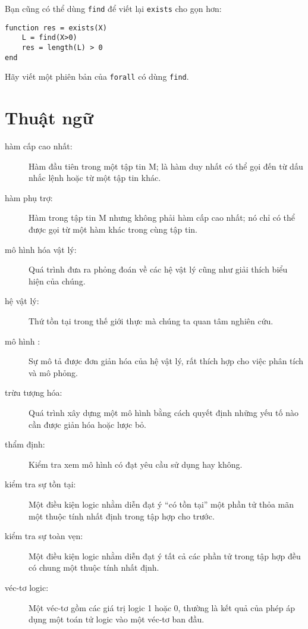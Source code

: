 \documentclass[12pt]{book}
\begin{document}
Bạn cũng có thể dùng {\tt find} để viết lại {\tt exists} cho gọn hơn:

\begin{verbatim}
function res = exists(X)
    L = find(X>0)
    res = length(L) > 0
end
\end{verbatim}
%
\begin{ex}
Hãy viết một phiên bản của {\tt forall} có dùng {\tt find}.
\end{ex}


\section{Thuật ngữ}

\begin{description}

\item[hàm cấp cao nhất:]  Hàm đầu tiên trong một tập tin M;
là hàm duy nhất có thể gọi đến từ dấu nhắc lệnh hoặc từ
một tập tin khác.

\item[hàm phụ trợ:] Hàm trong tập tin M nhưng không phải
hàm cấp cao nhất; nó chỉ có thể được gọi từ một hàm khác
trong cùng tập tin.

\item[mô hình hóa vật lý:] Quá trình đưa ra phỏng đoán về các
hệ vật lý cũng như giải thích biểu hiện của chúng.

\item[hệ vật lý:] Thứ tồn tại trong thế giới thực mà chúng ta
quan tâm nghiên cứu.

\item[mô hình :] Sự mô tả được đơn giản hóa của hệ vật lý,
rất thích hợp cho việc phân tích và mô phỏng.

\item[trừu tượng hóa:] Quá trình xây dựng một mô hình bằng cách
quyết định những yếu tố nào cần được giản hóa hoặc lược bỏ.

\item[thẩm định:] Kiểm tra xem mô hình có đạt yêu cầu sử dụng
hay không.

\item[kiểm tra sự tồn tại:] Một điều kiện logic nhằm diễn đạt ý
``có tồn tại'' một phần tử thỏa mãn một thuộc tính nhất định 
trong tập hợp cho trước.

\item[kiểm tra sự toàn vẹn:] Một điều kiện logic nhằm diễn đạt ý
tất cả các phần tử trong tập hợp đều có chung một thuộc tính nhất định.

\item[véc-tơ logic:] Một véc-tơ gồm các giá trị logic 1 hoặc 0, 
thường là kết quả của phép áp dụng một toán tử logic vào một 
véc-tơ ban đầu.


\end{description}
\end{document}
